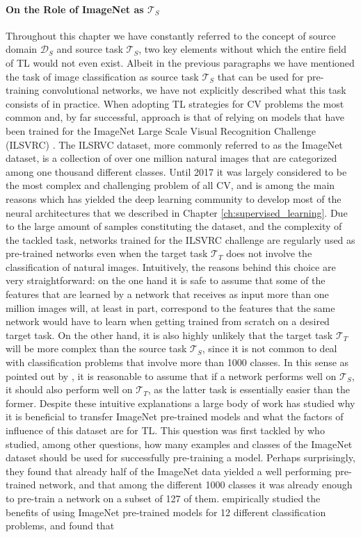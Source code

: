 \paragraph{On the Role of ImageNet as $\mathcal{T}_S$} Throughout this chapter we have constantly referred to the concept of source domain $\mathcal{D}_S$ and source task $\mathcal{T}_S$, two key elements without which the entire field of TL would not even exist. Albeit in the previous paragraphs we have mentioned the task of image classification as source task $\mathcal{T}_S$ that can be used for pre-training convolutional networks, we have not explicitly described what this task consists of in practice. When adopting TL strategies for CV problems the most common and, by far successful, approach is that of relying on models that have been trained for the ImageNet Large Scale Visual Recognition Challenge (ILSVRC) \cite{russakovsky2015imagenet}. The ILSRVC dataset, more commonly referred to as the ImageNet dataset, is a collection of over one million natural images that are categorized among one thousand different classes. Until 2017 it was largely considered to be the most complex and challenging problem of all CV, and is among the main reasons which has yielded the deep learning community to develop most of the neural architectures that we described in Chapter \ref{ch:supervised_learning}. Due to the large amount of samples constituting the dataset, and the complexity of the tackled task, networks trained for the ILSVRC challenge are regularly used as pre-trained networks even when the target task $\mathcal{T}_T$ does not involve the classification of natural images. Intuitively, the reasons behind this choice are very straightforward: on the one hand it is safe to assume that some of the features that are learned by a network that receives as input more than one million images will, at least in part, correspond to the features that the same network would have to learn when getting trained from scratch on a desired target task. On the other hand, it is also highly unlikely that the target task $\mathcal{T}_T$ will be more complex than the source task $\mathcal{T}_S$, since it is not common to deal with classification problems that involve more than 1000 classes. In this sense as pointed out by \citet{mensink2021factors}, it is reasonable to assume that if a network performs well on $\mathcal{T}_S$, it should also perform well on $\mathcal{T}_T$, as the latter task is essentially easier than the former. Despite these intuitive explanations a large body of work has studied why it is beneficial to transfer ImageNet pre-trained models and what the factors of influence of this dataset are for TL. This question was first tackled by \citet{huh2016makes} who studied, among other questions, how many examples and classes of the ImageNet dataset should be used for successfully pre-training a model. Perhaps surprisingly, they found that already half of the ImageNet data yielded a well performing pre-trained network, and that among the different 1000 classes it was already enough to pre-train a network on a subset of 127 of them. \citet{kornblith2019better} empirically studied the benefits of using ImageNet pre-trained models for 12 different classification problems, and found that 